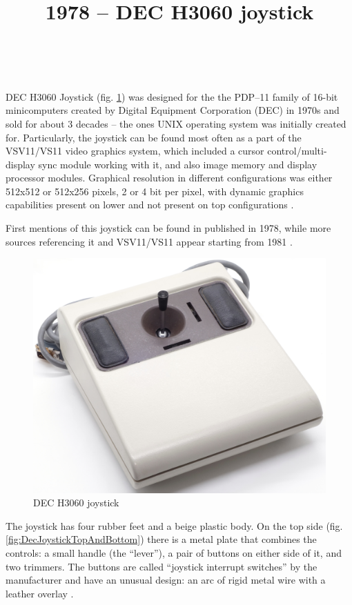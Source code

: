 \documentclass[11pt, a4paper]{article}
\begin{document}
\title{1978 -- DEC H3060 joystick}
\date{}
\author{~}
\maketitle
{}

DEC H3060 Joystick (fig. \ref{fig:DecJoystickPic}) was designed for the the PDP–11 family of 16-bit minicomputers created by Digital Equipment Corporation (DEC) in 1970s and sold for about 3 decades -- the ones UNIX operating system was initially created for. Particularly, the joystick can be found most often as a part of the VSV11/VS11 video graphics system, which included a cursor control/multi-display sync module working with it, and also image memory and display processor modules. Graphical resolution in different configurations was either 512x512 or 512x256 pixels, 2 or 4 bit per pixel, with dynamic graphics capabilities present on lower and not present on top configurations \cite{joystick}.

First mentions of this joystick can be found in \cite{fiche} published in 1978, while more sources referencing it and VSV11/VS11 appear starting from 1981 \cite{flyer, vsv11}.

\begin{figure}[h]
   \centering
    \includegraphics[scale=0.53]{1978_dec_h3060_joystick/pic_30.jpg}
    \caption{DEC H3060 joystick}
    \label{fig:DecJoystickPic}
\end{figure}

The joystick has four rubber feet and a beige plastic body. On the top side (fig. \ref{fig:DecJoystickTopAndBottom}) there is a metal plate that combines the controls: a small handle (the ``lever''), a pair of buttons on either side of it, and two trimmers. The buttons are called ``joystick interrupt switches'' by the manufacturer \cite{vsv11} and have an unusual design: an arc of rigid metal wire with a leather overlay \cite{joystick}.
\end{document}
